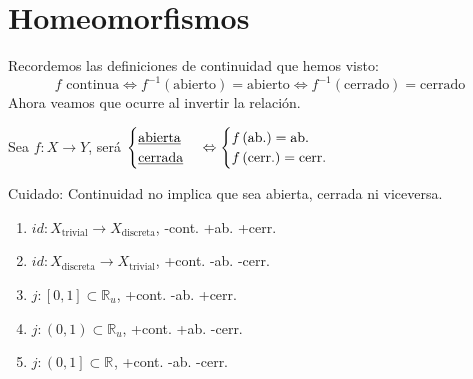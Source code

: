 \section{Homeomorfismos}%
\label{sec:homeomorfismos}
Recordemos las definiciones de continuidad que hemos visto:
\[
f \text{ continua} \Leftrightarrow f^{-1}\left( \text{abierto} \right) = \text{abierto} \Leftrightarrow f^{-1}\left( \text{cerrado} \right) = \text{cerrado} 
\]
Ahora veamos que ocurre al invertir la relación.
\begin{defi}
Sea $f: X \rightarrow Y$, será $\begin{cases}
    \text{\underline{abierta}} \\
    \text{\underline{cerrada}} 
\end{cases} \Leftrightarrow \begin{cases}
    f\left( \text{ab.} \right) = \text{ab.}\\
    f\left( \text{cerr.} \right) = \text{cerr.} 
\end{cases} $    
\end{defi}

\begin{obs}
Cuidado: Continuidad no implica que sea abierta, cerrada ni viceversa.
\end{obs}

\begin{ej}
\begin{enumerate}
    \item $id: X_{\text{trivial}} \rightarrow X_{\text{discreta}}$, -cont. +ab. +cerr.
    \item $id: X_{\text{discreta}} \rightarrow X_{\text{trivial}}$, +cont. -ab. -cerr.
    \item $j: \left[ 0, 1 \right] \subset \mathbb{R}_{u}$, +cont. -ab. +cerr. 
    \item $j: \left( 0, 1 \right) \subset \mathbb{R}_u$, +cont. +ab. -cerr.
    \item $j: \left( 0, 1 \right] \subset \mathbb{R}^{}$, +cont. -ab. -cerr.
\end{enumerate}
\end{ej}

